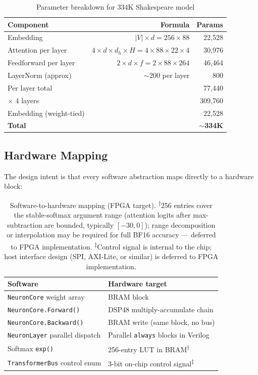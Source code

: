 \documentclass[11pt]{article}
\begin{document}
\begin{table}[ht]
\centering
\begin{tabular}{lrr}
\toprule
Component & Formula & Params \\
\midrule
Embedding & $|V| \times d = 256 \times 88$ & 22,528 \\
Attention per layer & $4 \times d \times d_h \times H = 4 \times 88 \times 22 \times 4$ & 30,976 \\
Feedforward per layer & $2 \times d \times f = 2 \times 88 \times 264$ & 46,464 \\
LayerNorm (approx) & $\sim$200 per layer & 800 \\
\midrule
Per layer total & & 77,440 \\
$\times$ 4 layers & & 309,760 \\
Embedding (weight-tied) & & 22,528 \\
\midrule
\textbf{Total} & & \textbf{$\sim$334K} \\
\bottomrule
\end{tabular}
\caption{Parameter breakdown for 334K Shakespeare model}
\label{tab:param-breakdown}
\end{table}

\subsection{Hardware Mapping}

The design intent is that every software abstraction maps directly to a hardware block:

\begin{table}[H]
\centering
\begin{tabular}{ll}
\toprule
Software & Hardware target \\
\midrule
\texttt{NeuronCore} weight array & BRAM block \\
\texttt{NeuronCore.Forward()} & DSP48 multiply-accumulate chain \\
\texttt{NeuronCore.Backward()} & BRAM write (same block, no bus) \\
\texttt{NeuronLayer} parallel dispatch & Parallel \texttt{always} blocks in Verilog \\
Softmax \texttt{exp()} & 256-entry LUT in BRAM\textsuperscript{$\dagger$} \\
\texttt{TransformerBus} control enum & 3-bit on-chip control signal\textsuperscript{$\ddagger$} \\
\bottomrule
\end{tabular}
\caption{Software-to-hardware mapping (FPGA target).
\textsuperscript{$\dagger$}256 entries cover the stable-softmax argument range (attention logits after max-subtraction are bounded, typically $[-30, 0]$); range decomposition or interpolation may be required for full BF16 accuracy --- deferred to FPGA implementation.
\textsuperscript{$\ddagger$}Control signal is internal to the chip; host interface design (SPI, AXI-Lite, or similar) is deferred to FPGA implementation.}
\end{table}
\end{document}
